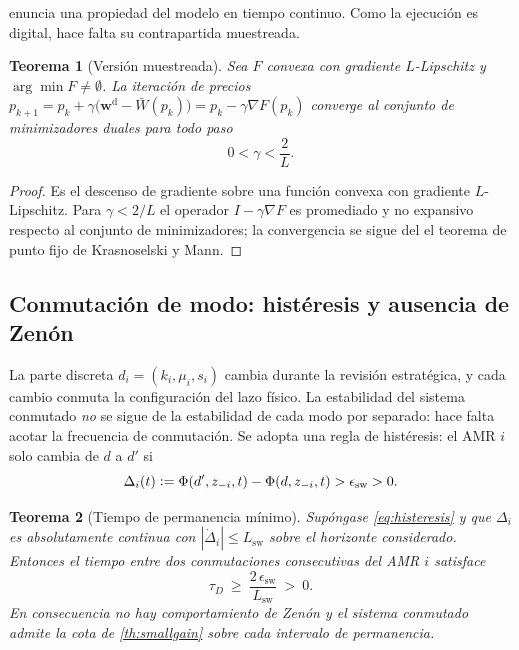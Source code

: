 \documentclass[11pt,a4paper]{article}
\theoremstyle{plain}
\newtheorem{teorema}{Teorema}[section]
\theoremstyle{definition}
\theoremstyle{remark}
\newcommand{\Wdem}{\bm{w}^{\mathrm{d}}}
\newcommand{\defeq}{\vcentcolon=}
\begin{document}
 enuncia una propiedad del modelo en tiempo continuo. Como
la ejecución es digital, hace falta su contrapartida muestreada.

\begin{teorema}[Versión muestreada]
\label{th:muestreada}
Sea $F$ convexa con gradiente $L$-Lipschitz y $\arg\min F\ne\emptyset$. La
iteración de precios
$p_{k+1}=p_k+\gamma\big(\Wdem-\bar W(p_k)\big)=p_k-\gamma\nabla F(p_k)$
converge al conjunto de minimizadores duales para todo paso
\begin{equation}
  0<\gamma<\frac{2}{L}.
  \label{eq:paso}
\end{equation}
\end{teorema}

\begin{proof}
Es el descenso de gradiente sobre una función convexa con gradiente
$L$-Lipschitz. Para $\gamma<2/L$ el operador $I-\gamma\nabla F$ es promediado y
no expansivo respecto al conjunto de minimizadores; la convergencia se sigue del
el teorema de punto fijo de Krasnoselski y Mann.
\end{proof}

\subsection{Conmutación de modo: histéresis y ausencia de Zenón}

La parte discreta $d_i=(k_i,\mu_i,s_i)$ cambia durante la revisión estratégica,
y cada cambio conmuta la configuración del lazo físico. La estabilidad del
sistema conmutado \emph{no} se sigue de la estabilidad de cada modo por
separado: hace falta acotar la frecuencia de conmutación. Se adopta una regla
de histéresis: el AMR $i$ solo cambia de $d$ a $d'$ si
\begin{equation}
  \Delta_i(t)\defeq\Phi(d',z_{-i},t)-\Phi(d,z_{-i},t)>\epsilon_{\mathrm{sw}}>0 .
  \label{eq:histeresis}
\end{equation}

\begin{teorema}[Tiempo de permanencia mínimo]
\label{th:dwell}
Supóngase \eqref{eq:histeresis} y que $\Delta_i$ es absolutamente continua con
$|\dot\Delta_i|\le L_{\mathrm{sw}}$ sobre el horizonte considerado. Entonces el
tiempo entre dos conmutaciones consecutivas del AMR $i$ satisface
\[
  \tau_D\ \ge\ \frac{2\,\epsilon_{\mathrm{sw}}}{L_{\mathrm{sw}}}\ >\ 0 .
\]
En consecuencia no hay comportamiento de Zenón y el sistema conmutado admite la
cota de \cref{th:smallgain} sobre cada intervalo de permanencia.
\end{teorema}
\end{document}
